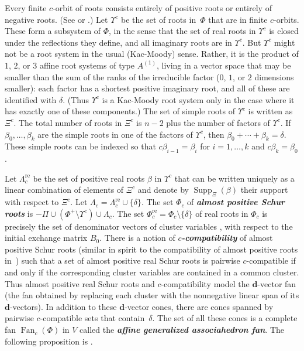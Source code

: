 \documentclass[10pt]{article}
\theoremstyle{definition}
\theoremstyle{remark}
\numberwithin{equation}{section}
\newcommand{\newword}[1]{\textbf{\emph{#1}}}
\newcommand{\set}[1]{{\lbrace #1 \rbrace}}
\newcommand{\0}{{\mathbf{0}}}
\newcommand{\Fan}{\operatorname{Fan}}
\newcommand{\re}{\mathrm{re}}
\newcommand{\dd}{{\mathbf d}}
\newcommand{\RSChar}{\Phi}
\newcommand{\RS}{\RSChar}
\newcommand{\RSpos}{\RS^+}
\newcommand{\SimplesChar}{\Pi}
\newcommand{\Simples}{\SimplesChar}
\newcommand{\RSTChar}{\Upsilon}
\newcommand{\RST}[1]{\RSTChar^{#1}}
\newcommand{\SimplesTChar}{\Xi}
\newcommand{\SimplesT}[1]{\SimplesTChar^{#1}}
\newcommand{\SuppT}{\operatorname{Supp}_\SimplesTChar}
\newcommand{\AP}[1]{\RS_{#1}}
\newcommand{\APre}[1]{\AP{#1}^\re}
\newcommand{\APTChar}{\Lambda}
\newcommand{\APT}[1]{\APTChar_{#1}}
\newcommand{\APTre}[1]{\APT{#1}^\re}
\newcommand{\afftype}[1]{{#1^{(1)}}}
\begin{document}
Every finite $c$-orbit of roots consists entirely of positive roots or entirely of negative roots.
(See \cite[Chapter~1]{Dlab-Ringel} or \cite[Theorem~1.2(5)]{afforb}.)
Let $\RST{c}$ be the set of roots in~$\RS$ that are in finite $c$-orbits.
These form a subsystem of $\RS$, in the sense that the set of real roots in $\RST{c}$ is closed under the reflections they define, and all imaginary roots are in $\RST{c}$.
But $\RST{c}$ might not be a root system in the usual (Kac-Moody) sense.
Rather, it is the product of $1$, $2$, or $3$ affine root systems of type $\afftype{A}$, living in a vector space that may be smaller than the sum of the ranks of the irreducible factor ($0$, $1$, or $2$ dimensions smaller):
each factor has a shortest positive imaginary root, and all of these are identified with $\delta$.
(Thus $\RST{c}$ is a Kac-Moody root system only in the case where it has exactly one of these components.)
The set of simple roots of $\RST{c}$ is written as $\SimplesT{c}$.
The total number of roots in $\SimplesT{c}$ is $n-2$ plus the number of factors of $\RST{c}$.
If $\beta_0,\ldots,\beta_k$ are the simple roots in one of the factors of $\RST{c}$, then $\beta_0+\cdots+\beta_k=\delta$.
These simple roots can be indexed so that $c\beta_{i-1}=\beta_i$ for $i=1,\ldots,k$ and $c\beta_k=\beta_0$.


Let $\APTre{c}$ be the set of positive real roots $\beta$ in $\RST{c}$ that can be written uniquely as a linear combination of elements of $\SimplesT{c}$ and denote by $\SuppT(\beta)$ their support with respect to $\SimplesT{c}$.
Let $\APT{c}=\APTre{c}\cup\set\delta$. 
The set $\AP{c}$ of \newword{almost positive Schur roots} is ${-\Simples\cup(\RSpos\setminus\RST{c})\cup\APT{c}}$.
The set $\APre{c}=\AP{c}\setminus\set\delta$ of real roots in $\AP{c}$ is precisely the set of denominator vectors of cluster variables \cite[Theorem~1.2]{affdenom}, with respect to the initial exchange matrix $B_0$.
There is a notion \cite[Definition~4.3]{affdenom} of \newword{$c$-compatibility} of almost positive Schur roots (similar in spirit to the compatibility of almost positive roots in~\cite{ga}) such that a set of almost positive real Schur roots is pairwise $c$-compatible if and only if the corresponding cluster variables are contained in a common cluster.
Thus almost positive real Schur roots and $c$-compatibility model the $\dd$-vector fan (the fan obtained by replacing each cluster with the nonnegative linear span of its $\dd$-vectors).
In addition to these $\dd$-vector cones, there are cones spanned by pairwise $c$-compatible sets that contain~$\delta$.
The set of all these cones is a complete fan $\Fan_c(\RS)$ in $V$ called the \newword{affine generalized associahedron fan}.
The following proposition is \cite[Proposition~5.6]{affdenom}.
\end{document}
